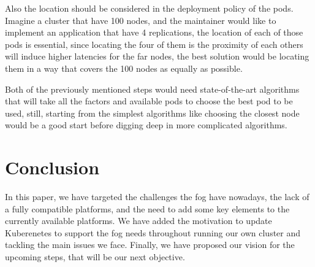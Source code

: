\documentclass[letterpaper,twocolumn,10pt]{article}
\begin{document}
Also the location should be considered in the deployment policy of the pods. Imagine a cluster that have 100 nodes, and the maintainer would like to implement an application that have 4 replications, the location of each of those pods is essential, since locating the four of them is the proximity of each others will induce higher latencies for the far nodes, the best solution would be locating them in a way that covers the 100 nodes as equally as possible. 

Both of the previously mentioned steps would need state-of-the-art algorithms that will take all the factors and available pods to choose the best pod to be used, still, starting from the simplest algorithms like choosing the closest node would be a good start before digging deep in more complicated algorithms.









\section{Conclusion}\label{sec:conclusion}

In this paper, we have targeted the challenges the fog have nowadays,
the lack of a fully compatible platforms, and the need to add some key
elements to the currently available platforms. We have added the
motivation to update Kuberenetes to support the fog needs throughout
running our own cluster and tackling the main issues we face. Finally,
we have proposed our vision for the upcoming steps, that will be our
next objective.
\end{document}
